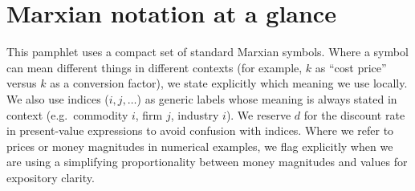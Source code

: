 \section{Marxian notation at a glance}
\label{sec:notation}

\noindent This pamphlet uses a compact set of standard Marxian symbols. Where a symbol can mean different things in different contexts (for example, $k$ as ``cost price'' versus $k$ as a conversion factor), we state explicitly which meaning we use locally. We also use indices ($i,j,\dots$) as generic labels whose meaning is always stated in context (e.g.\ commodity $i$, firm $j$, industry $i$). We reserve $d$ for the discount rate in present-value expressions to avoid confusion with indices. Where we refer to prices or money magnitudes in numerical examples, we flag explicitly when we are using a simplifying proportionality between money magnitudes and values for expository clarity.

\begingroup
\footnotesize
\setlength{\LTpre}{6pt}      %
\setlength{\LTpost}{0pt}
\setlength{\LTcapwidth}{\textwidth}
\setlength{\tabcolsep}{4pt}
\renewcommand{\arraystretch}{1.18} %

